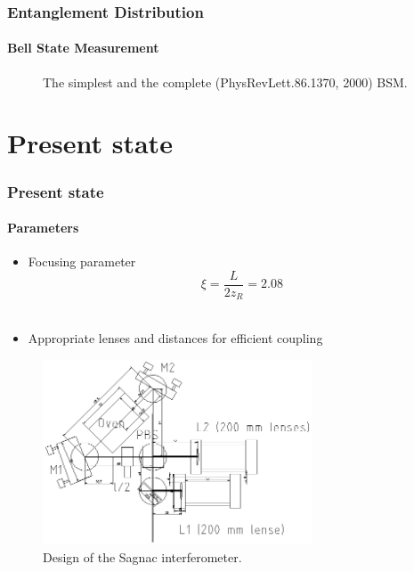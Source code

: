 \documentclass[serif,8pt]{beamer}
\begin{document}
\begin{frame}[t]
	\frametitle{Entanglement Distribution}
	\framesubtitle{Bell State Measurement}
	\begin{figure}
		\begin{center}
			\quad
		\end{center}
		\caption{The simplest and the complete (PhysRevLett.86.1370, 2000) BSM.}
		\label{fig:BSMSimple}
	\end{figure}
\end{frame}


\section{Present state}
\begin{frame}[t]
	\frametitle{Present state}
	\framesubtitle{Parameters}
		\begin{itemize}
			\item Focusing parameter \cite{bennik}
					\begin{equation*}
							\xi = \frac{L}{2 z_R} = 2.08
						\label{eq:Focusing parameter}
					\end{equation*}\\
			\item Appropriate lenses and distances for efficient coupling
		\end{itemize}
	\begin{figure}[!ht]
	  \centering
	  \includegraphics[width=8cm]{SagnacDesign.png}
	  \caption{Design of the Sagnac interferometer.}
	\end{figure}
\end{frame}
\end{document}

